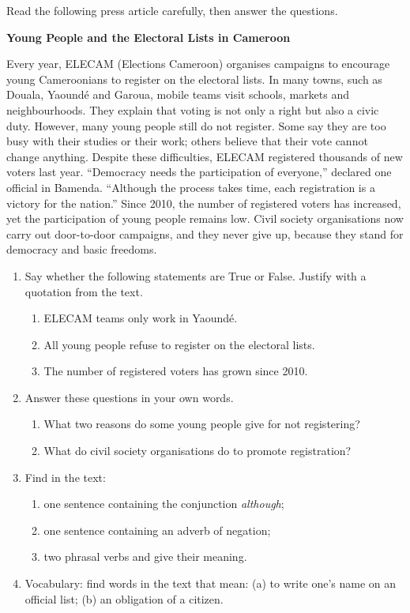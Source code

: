 \documentclass[11pt]{article}
\begin{document}
\begin{exercice}
Read the following press article carefully, then answer the questions.

\textbf{Young People and the Electoral Lists in Cameroon}

Every year, ELECAM (Elections Cameroon) organises campaigns to encourage young Cameroonians to register on the electoral lists. In many towns, such as Douala, Yaoundé and Garoua, mobile teams visit schools, markets and neighbourhoods. They explain that voting is not only a right but also a civic duty. However, many young people still do not register. Some say they are too busy with their studies or their work; others believe that their vote cannot change anything. Despite these difficulties, ELECAM registered thousands of new voters last year. ``Democracy needs the participation of everyone,'' declared one official in Bamenda. ``Although the process takes time, each registration is a victory for the nation.'' Since 2010, the number of registered voters has increased, yet the participation of young people remains low. Civil society organisations now carry out door-to-door campaigns, and they never give up, because they stand for democracy and basic freedoms.

\begin{enumerate}
\item Say whether the following statements are True or False. Justify with a quotation from the text.
\begin{enumerate}
\item ELECAM teams only work in Yaoundé.
\item All young people refuse to register on the electoral lists.
\item The number of registered voters has grown since 2010.
\end{enumerate}
\item Answer these questions in your own words.
\begin{enumerate}
\item What two reasons do some young people give for not registering?
\item What do civil society organisations do to promote registration?
\end{enumerate}
\item Find in the text:
\begin{enumerate}
\item one sentence containing the conjunction \emph{although};
\item one sentence containing an adverb of negation;
\item two phrasal verbs and give their meaning.
\end{enumerate}
\item Vocabulary: find words in the text that mean: (a) to write one's name on an official list; (b) an obligation of a citizen.
\end{enumerate}
\end{exercice}
\end{document}
